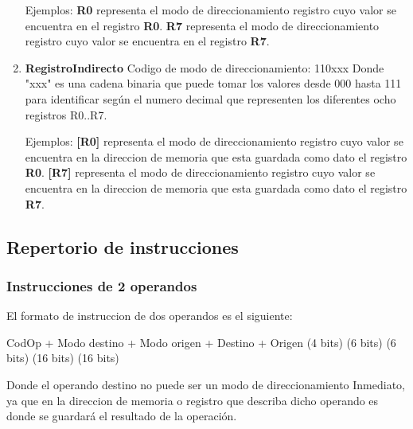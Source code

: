 \begin{enumerate}
Ejemplos:
\textbf{R0} representa el modo de direccionamiento registro cuyo valor se encuentra en el registro \textbf{R0}.
\textbf{R7} representa el modo de direccionamiento registro cuyo valor se encuentra en el registro \textbf{R7}.

\item \textbf{RegistroIndirecto}
Codigo de modo de direccionamiento: 110xxx 
Donde "xxx" es una cadena binaria que puede tomar los valores desde 000 hasta 111 para identificar según el numero decimal que representen los diferentes ocho registros R0..R7.

Ejemplos:
\textbf{[R0]} representa el modo de direccionamiento registro cuyo valor se encuentra en la direccion de memoria que esta guardada como dato el registro \textbf{R0}.
\textbf{[R7]} representa el modo de direccionamiento registro cuyo valor se encuentra en la direccion de memoria que esta guardada como dato el registro \textbf{R7}.

\end{enumerate}


\subsection{Repertorio de instrucciones}

\subsubsection{Instrucciones de 2 operandos}
El formato de instruccion de dos operandos es el siguiente:

  CodOp   +  Modo destino +  Modo origen +  Destino  +   Origen
(4 bits)       (6 bits)        (6 bits)    (16 bits)    (16 bits)  

Donde el operando destino no puede ser un modo de direccionamiento Inmediato, ya que en la direccion de memoria o registro que describa dicho operando es donde se guardará el resultado de la operación.

